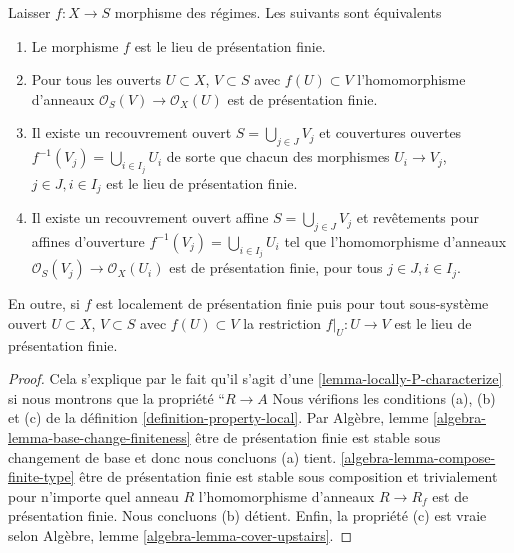 \begin{lemma}

\label{lemma-locally-finite-presentation-characterize}

Laisser $f : X \to S$ morphisme des régimes. Les suivants sont équivalents

\begin{enumerate}

\item Le morphisme $f$ est le lieu de présentation finie.
\item Pour tous les ouverts $U \subset X$, $V \subset S$
avec $f(U) \subset V$ l'homomorphisme d'anneaux
$\mathcal{O}_S(V) \to \mathcal{O}_X(U)$ est de présentation finie.
\item Il existe un recouvrement ouvert $S = \bigcup_{j \in J} V_j$
et couvertures ouvertes $f^{-1}(V_j) = \bigcup_{i \in I_j} U_i$ de sorte que chacun des morphismes $U_i \to V_j$, $j\in J, i\in I_j$
est le lieu de présentation finie.
\item Il existe un recouvrement ouvert affine $S = \bigcup_{j \in J} V_j$
et revêtements pour affines d'ouverture $f^{-1}(V_j) = \bigcup_{i \in I_j} U_i$ tel que l'homomorphisme d'anneaux $\mathcal{O}_S(V_j) \to \mathcal{O}_X(U_i)$ est de présentation finie, pour tous $j\in J, i\in I_j$.

\end{enumerate}

En outre, si $f$ est localement de présentation finie puis pour tout sous-système ouvert $U \subset X$, $V \subset S$ avec $f(U) \subset V$
la restriction $f|_U : U \to V$ est le lieu de présentation finie.

\end{lemma}

\begin{proof}

Cela s'explique par le fait qu'il s'agit d'une \ref{lemma-locally-P-characterize} si nous montrons que la propriété ``$R \to A$ Nous vérifions les conditions (a), (b) et (c) de la définition
\ref{definition-property-local}. Par Algèbre, lemme \ref{algebra-lemma-base-change-finiteness}
être de présentation finie est stable sous changement de base et donc nous concluons (a) tient.
\ref{algebra-lemma-compose-finite-type} être de présentation finie est stable sous composition et trivialement pour n'importe quel anneau
$R$ l'homomorphisme d'anneaux $R \to R_f$ est de présentation finie. Nous concluons (b) détient. Enfin, la propriété (c) est vraie selon Algèbre, lemme \ref{algebra-lemma-cover-upstairs}.

\end{proof}

